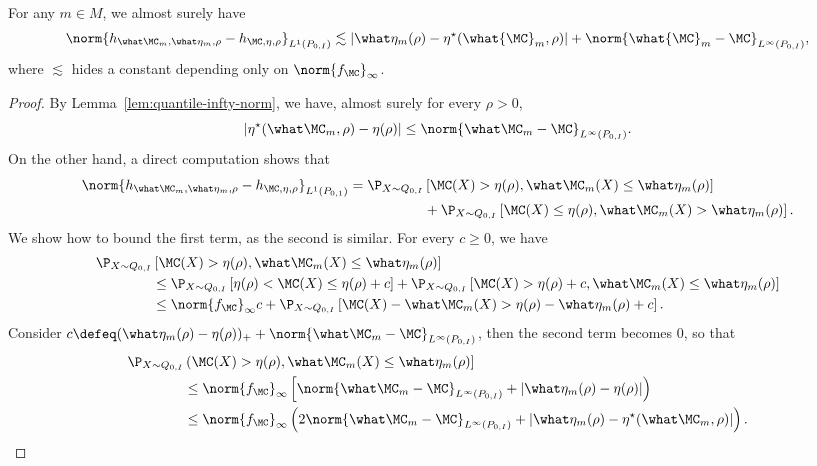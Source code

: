 \begin{lemma}
\label{lem:bound-h-indicator}
For any $m \in M$, we almost surely have
\begin{align*}
\norm{ h_{\what \MC_m, \what \eta_m, \rho} - h_{\MC, \eta, \rho}}_{L^1(P_{0,I})} \lesssim \left| \what \eta_m(\rho) - \eta^\star(\what{\MC}_m, \rho) \right| + \norm{\what{\MC}_m - \MC}_{L^\infty(P_{0,I})},
\end{align*}
where $\lesssim$ hides a constant depending only on $\norm{f_{\MC}}_\infty$.
\end{lemma}
\begin{proof}
By Lemma~\ref{lem:quantile-infty-norm}, we have, almost surely for every $\rho > 0$,
\begin{align*}
\left| \eta^\star( \what \MC_m, \rho ) - \eta(\rho) \right| \le \norm{ \what \MC_m - \MC}_{L^\infty(P_{0,I})}.
\end{align*}
On the other hand, a direct computation shows that
\begin{align*}
\begin{split}
\norm{ h_{\what \MC_m, \what \eta_m, \rho} - h_{\MC, \eta, \rho}}_{L^1(P_{0,1})} = \P_{X \sim Q_{0,I}} &\left[ \MC(X) > \eta(\rho), \what \MC_m(X) \le \what \eta_m(\rho) \right] \\
&+ \P_{X \sim Q_{0,I}}\left[ \MC(X) \le \eta(\rho), \what \MC_m(X) > \what \eta_m(\rho) \right].
\end{split}
\end{align*}
We show how to bound the first term, as the second is similar.
For every $c \ge 0$, we have
\begin{align*}
\P_{X \sim Q_{0,I}} &\left[ \MC(X) > \eta(\rho), \what \MC_m(X) \le \what \eta_m(\rho) \right] \\
&\le
 \P_{X \sim Q_{0,I}} \left[ \eta(\rho) < \MC(X) \le \eta(\rho) + c \right]
 +  \P_{X \sim Q_{0,I}}\left[ \MC(X) > \eta(\rho) + c, 
\what \MC_m(X) \le \what \eta_m(\rho) \right] 
\\
&\le \norm{f_{\MC}}_\infty c +  \P_{X \sim Q_{0,I}}\left[ \MC(X) - \what \MC_m(X) > \eta(\rho) - \what \eta_m(\rho) + c \right].
\end{align*}
Consider $c \defeq (\what \eta_m(\rho) - \eta(\rho))_+ +  \norm{ \what \MC_m - \MC}_{L^\infty(P_{0,I})}$,  then the second term becomes $0$, so that
\begin{align*}
\P_{X \sim Q_{0,I}} &\left( \MC(X) > \eta(\rho), \what \MC_m(X) \le \what \eta_m(\rho) \right]  \\
&\le \norm{f_{\MC}}_\infty \left[  \norm{ \what \MC_m - \MC}_{L^\infty(P_{0,I})} + \left|\what \eta_m(\rho) - \eta(\rho) \right| \right) \\
&\le \norm{f_{\MC}}_\infty \left( 2\norm{ \what \MC_m - \MC}_{L^\infty(P_{0,I})} + \left|\what \eta_m(\rho) - \eta^\star(\what \MC_m, \rho) \right| \right).
\end{align*}
\end{proof}

